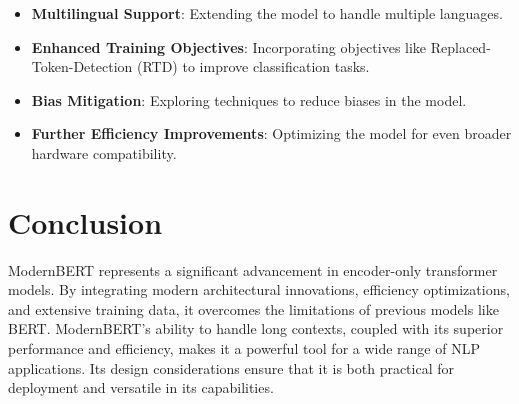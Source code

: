 \documentclass{article}
\begin{document}
\begin{itemize}  
    \item \textbf{Multilingual Support}: Extending the model to handle multiple languages.  
    \item \textbf{Enhanced Training Objectives}: Incorporating objectives like Replaced-Token-Detection (RTD) to improve classification tasks.  
    \item \textbf{Bias Mitigation}: Exploring techniques to reduce biases in the model.  
    \item \textbf{Further Efficiency Improvements}: Optimizing the model for even broader hardware compatibility.  
\end{itemize}  
  
\section{Conclusion}  
  
ModernBERT represents a significant advancement in encoder-only transformer models. By integrating modern architectural innovations, efficiency optimizations, and extensive training data, it overcomes the limitations of previous models like BERT. ModernBERT's ability to handle long contexts, coupled with its superior performance and efficiency, makes it a powerful tool for a wide range of NLP applications. Its design considerations ensure that it is both practical for deployment and versatile in its capabilities.  
  
\end{document}
